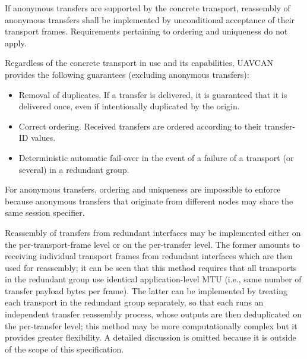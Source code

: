 If anonymous transfers are supported by the concrete transport,
reassembly of anonymous transfers shall be implemented by unconditional acceptance of their transport frames.
Requirements pertaining to ordering and uniqueness do not apply.

\begin{remark}
    Regardless of the concrete transport in use and its capabilities,
    UAVCAN provides the following guarantees (excluding anonymous transfers):

    \begin{itemize}
        \item Removal of duplicates. If a transfer is delivered, it is guaranteed that it is delivered once,
              even if intentionally duplicated by the origin.
        \item Correct ordering. Received transfers are ordered according to their transfer-ID values.
        \item Deterministic automatic fail-over in the event of a failure of a transport (or several)
              in a redundant group.
    \end{itemize}

    For anonymous transfers, ordering and uniqueness are impossible to enforce
    because anonymous transfers that originate from different nodes may share the same session specifier.

    Reassembly of transfers from redundant interfaces may be implemented either on the per-transport-frame level
    or on the per-transfer level.
    The former amounts to receiving individual transport frames from redundant interfaces
    which are then used for reassembly; it can be seen that this method requires that all transports in the
    redundant group use identical application-level MTU (i.e., same number of transfer payload bytes per frame).
    The latter can be implemented by treating each transport in the redundant group separately,
    so that each runs an independent transfer reassembly process, whose outputs are then deduplicated
    on the per-transfer level; this method may be more computationally complex but it provides greater flexibility.
    A detailed discussion is omitted because it is outside of the scope of this specification.
\end{remark}
